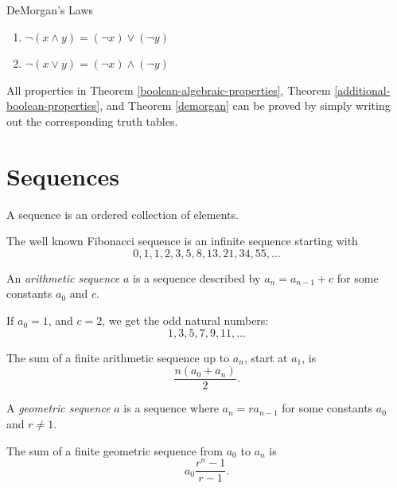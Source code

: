 \begin{thm}{DeMorgan's Laws}\label{demorgan}\proofbreak
    \begin{enumerate}
        \item $\neg(x \land y) = (\neg x) \lor (\neg y)$
        \item $\neg(x \lor y) = (\neg x) \land (\neg y)$
    \end{enumerate}
\end{thm}

\begin{rmk}
    All properties in Theorem \ref{boolean-algebraic-properties}, Theorem \ref{additional-boolean-properties}, and Theorem \ref{demorgan} can be proved by simply writing out the corresponding truth tables.
\end{rmk}

\section{Sequences}

\begin{defn}
    A sequence is an ordered collection of elements.
\end{defn}

\begin{exmp}
    The well known Fibonacci sequence is an infinite sequence starting with \[0, 1, 1, 2, 3, 5, 8, 13, 21, 34, 55, \ldots\]
\end{exmp}

\begin{defn}
    An \emph{arithmetic sequence} $a$ is a sequence described by $a_n = a_{n-1} + c$ for some constants $a_0$ and $c$.
\end{defn}

\begin{exmp}
    If $a_0 = 1$, and $c = 2$, we get the odd natural numbers: \[1, 3, 5, 7, 9, 11, \ldots\]
\end{exmp}

\begin{prop}
    The sum of a finite arithmetic sequence up to $a_n$, start at $a_1$, is \[\frac{n(a_0 + a_n)}{2}.\]
\end{prop}

\begin{defn}
    A \emph{geometric sequence} $a$ is a sequence where $a_n = ra_{n-1}$ for some constants $a_0$ and $r \neq 1$.
\end{defn}

\begin{prop}
    The sum of a finite geometric sequence from $a_0$ to $a_n$ is \[a_0\frac{r^n - 1}{r - 1}.\]
\end{prop}

